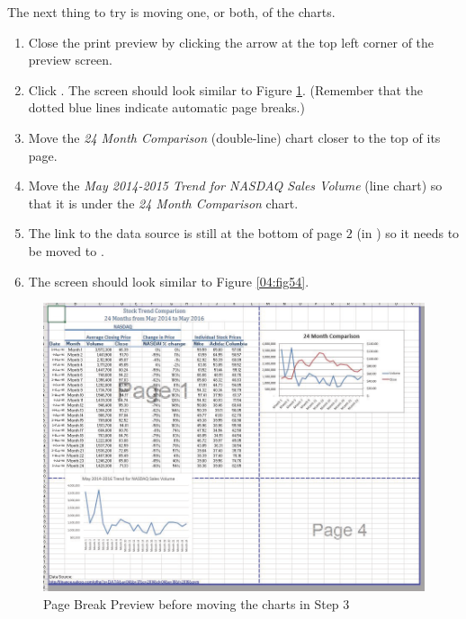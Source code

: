 The next thing to try is moving one, or both, of the charts. 

\begin{enumerate}
	\item Close the print preview by clicking the arrow at the top left corner of the preview screen.
	\item Click . The screen should look similar to Figure \ref{04:fig53}. (Remember that the dotted blue lines indicate automatic page breaks.)
	\item Move the \textit{24 Month Comparison} (double-line) chart closer to the top of its page.
	\item Move the \textit{May 2014-2015 Trend for NASDAQ Sales Volume} (line chart) so that it is under the \textit{24 Month Comparison} chart.
	\item The link to the data source is still at the bottom of page $ 2 $ (in ) so it needs to be moved to .
	\item The screen should look similar to Figure \ref{04:fig54}.
\end{enumerate}

\begin{figure}[H]
	\centering
	\includegraphics[width=\maxwidth{.95\linewidth}]{gfx/ch04_fig53}
	\caption{Page Break Preview before moving the charts in Step 3}
	\label{04:fig53}
\end{figure}

